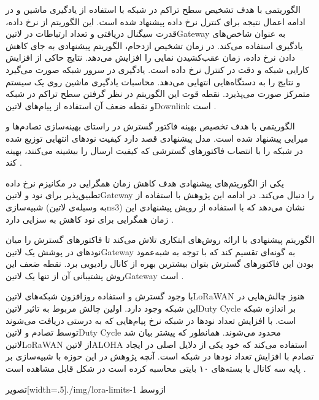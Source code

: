 الگوریتمی با هدف تشخیص سطح تراکم در شبکه با استفاده از یادگیری ماشین و در ادامه اعمال نتیجه برای کنترل نرخ داده پیشنهاد شده است.
این الگوریتم از نرخ داده، قدرت سیگنال دریافتی و تعداد ارتباطات در ‌لاتین{Gateway} به عنوان شاخص‌های یادگیری استفاده می‌کند.
در زمان تشخیص ازدحام، الگوریتم پیشنهادی به جای کاهش دادن نرخ داده، زمان عقب‌کشیدن نمایی را افزایش می‌دهد.
نتایج حاکی از افزایش کارایی شبکه و دقت در کنترل نرخ داده است. یادگیری در سرور شبکه صورت می‌گیرد و نتایج را به دستگاه‌هایی انتهایی می‌دهد.
محاسبات یادگیری ماشین روی یک سیستم متمرکز صورت می‌پذیرد. نقطه قوت این الگوریتم در نظر گرفتن سطح تراکم در شبکه و نقطه ضعف آن استفاده
از پیام‌های ‌لاتین{Downlink} است
.

الگوریتمی با هدف تخصیص بهینه فاکتور گسترش در راستای بهینه‌سازی تصادم‌ها و میرایی پیشنهاد شده است.
مدل پیشنهادی قصد دارد کیفیت نودهای انتهایی توزیع شده در شبکه را با انتصاب فاکتورهای گسترشی که کیفیت ارسال را بیشینه می‌کنند، بهینه کند
.

یکی از الگوریتم‌های پیشنهادی هدف کاهش زمان همگرایی در مکانیزم نرخ داده تطبیق‌پذیر برای نود و ‌لاتین{Gateway} را دنبال می‌کند.
در ادامه این پژوهش با استفاده از شبیه‌سازی (به وسیله‌ی ‌لاتین{ns3}) نشان می‌دهد که با استفاده از رویش پیشنهادی این زمان همگرایی برای نود کاهش به سزایی دارد
.

الگوریتم پیشنهادی با ارائه روش‌های ابتکاری تلاش می‌کند تا فاکتورهای گسترش را میان نودهای در پوشش یک ‌لاتین{Gateway} به گونه‌ای تقسیم کند
که با توجه به شبه‌عمود بودن این فاکتورهای گسترش بتوان بیشترین بهره از کانال رادیویی برد. نقطه ضعف این روش پشتیبانی آن از تنها یک ‌لاتین{Gateway}
است
.


با وجود گسترش و استفاده روزافزون شبکه‌های ‌لاتین{LoRaWAN} هنوز چالش‌هایی در این شبکه وجود دارد. اولین چالش مربوط به تاثیر
‌لاتین{Duty Cycle} بر اندازه شبکه است. با افزایش تعداد نودها در شبکه نرخ پیام‌هایی که به درستی دریافت می‌شوند توسط تصادم و
‌لاتین{Duty Cycle} محدود می‌شوند. همانطور که پیشتر بیان شد ‌لاتین{LoRaWAN} از ‌لاتین{ALOHA} استفاده می‌کند
که خود یکی از دلایل اصلی در ایجاد تصادم با افزایش تعداد نودها در شبکه است. آنچه پژوهش  در این حوزه
با شبیه‌سازی بر پایه سه کانال با بسته‌های ۱۰ بایتی محاسبه کرده است در شکل  قابل مشاهده است
.

‌تصویر[width=.5\textwidth]{./img/lora-limits-1}
‌ازوسط


